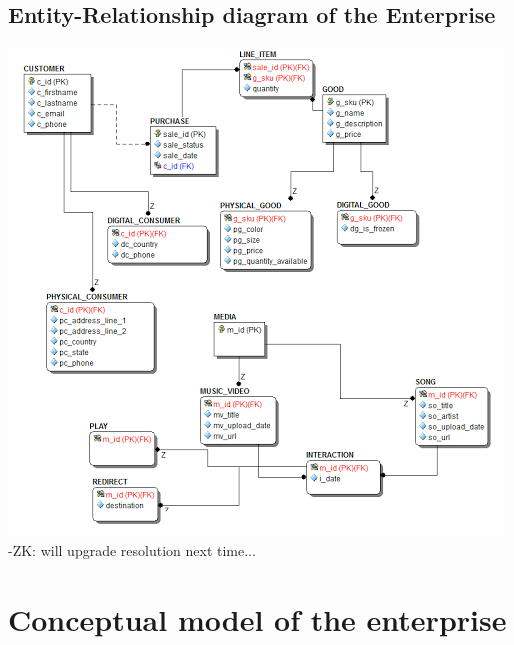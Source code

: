 \documentclass[11pt, a4paper]{report}
\begin{document}
\subsection{Entity-Relationship diagram of the Enterprise}
\includegraphics[]{ERB.png}
-ZK: will upgrade resolution next time...

\clearpage
\section{Conceptual model of the enterprise}
\end{document}
